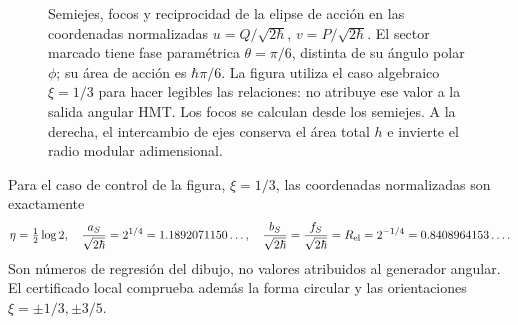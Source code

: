 \begin{figure}[htbp]
\endgroup


 \caption{Semiejes, focos y reciprocidad de la elipse de acción en las
 coordenadas normalizadas \(u=Q/\sqrt{2\hbar}\),
 \(v=P/\sqrt{2\hbar}\). El sector marcado tiene fase paramétrica
 \(\theta=\pi/6\), distinta de su ángulo polar \(\phi\); su área
 de acción es \(\hbar\pi/6\). La figura utiliza el caso algebraico
 \(\xi=1/3\) para hacer legibles las relaciones: no atribuye ese valor
 a la salida angular HMT. Los focos se calculan desde los semiejes.
 A la derecha, el intercambio de ejes conserva el área total \(h\)
 e invierte el radio modular adimensional.}
 \label{ii:fig:ii-elipse-calculada}
\end{figure}

Para el caso de control de la figura, \(\xi=1/3\), las coordenadas
normalizadas son exactamente
\[
 \eta=\tfrac12\log2,\quad
 \frac{a_S}{\sqrt{2\hbar}}=2^{1/4}=1.1892071150\ldots,\quad
 \frac{b_S}{\sqrt{2\hbar}}=
 \frac{f_S}{\sqrt{2\hbar}}=R_{\rm el}=2^{-1/4}=0.8408964153\ldots.
\]
Son números de regresión del dibujo, no valores atribuidos al generador
angular. El certificado local comprueba además la forma circular y las
orientaciones \(\xi=\pm1/3,\pm3/5\).

